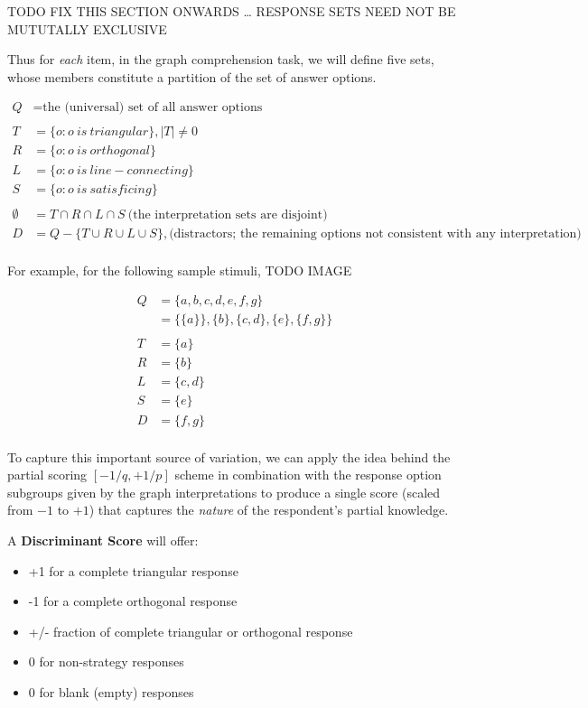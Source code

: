 \documentclass[
  letterpaper,
  DIV=11,
  numbers=noendperiod]{scrreprt}
\providecommand{\tightlist}{%
  \setlength{\itemsep}{0pt}\setlength{\parskip}{0pt}}\usepackage{longtable,booktabs,array}
\begin{document}
TODO FIX THIS SECTION ONWARDS \ldots{} RESPONSE SETS NEED NOT BE
MUTUTALLY EXCLUSIVE

Thus for \emph{each} item, in the graph comprehension task, we will
define five sets, whose members constitute a partition of the set of
answer options.

\begin{align}
Q &= \text{the (universal) set of all answer options } \\
\\
T &=  \{o:o \:is\:triangular  \}, |T| \ne 0  \\
R &=  \{o:o \:is\:orthogonal \} \\
L &=  \{o:o \:is\:line-connecting \} \\
S &=  \{o:o \:is\:satisficing \} \\
\\
\emptyset &= T \cap R \cap L \cap S  \: \text{(the interpretation sets are disjoint)}\\
D &= Q - \{T \cup R \cup L \cup S \} , \text{(distractors; the remaining options not consistent with any interpretation})
\\
\end{align}

For example, for the following sample stimuli, TODO IMAGE

\begin{align}
Q &= \{a, b, c, d, e, f, g \} \\
  &= \{ \{a \}\}, \{b\}, \{c,d\}, \{e\},  \{f,g\}\} \\
\\
T &= \{ a \} \\
R &= \{ b \} \\
L &= \{ c,d \} \\
S &= \{ e \} \\
D &= \{ f, g\} \\
\end{align}

To capture this important source of variation, we can apply the idea
behind the partial scoring \([-1/q, +1/p]\) scheme in combination with
the response option subgroups given by the graph interpretations to
produce a single score (scaled from \(-1\) to \(+1\)) that captures the
\emph{nature} of the respondent's partial knowledge.

A \textbf{Discriminant Score} will offer:

\begin{itemize}
\tightlist
\item
  +1 for a complete triangular response
\item
  -1 for a complete orthogonal response
\item
  +/- fraction of complete triangular or orthogonal response
\item
  0 for non-strategy responses
\item
  0 for blank (empty) responses
\end{itemize}
\end{document}
